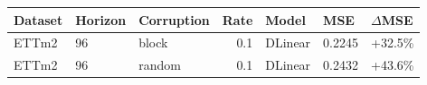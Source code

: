 \begin{tabular}{lllrlll}
\toprule
Dataset & Horizon & Corruption & Rate & Model & MSE & $\Delta$MSE \\
\midrule
ETTm2 & 96 & block & 0.1 & DLinear & 0.2245 & +32.5\% \\
ETTm2 & 96 & random & 0.1 & DLinear & 0.2432 & +43.6\% \\
\bottomrule
\end{tabular}
